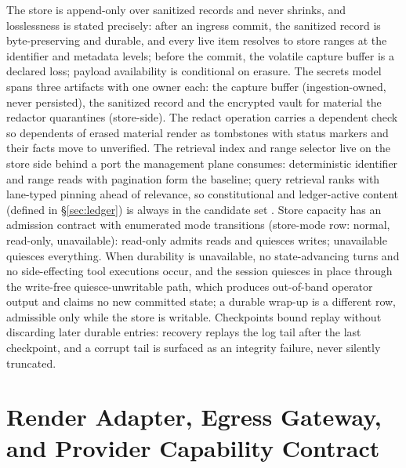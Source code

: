 \documentclass[11pt]{article}
\begin{document}
The store is append-only over sanitized records and never shrinks, and losslessness is stated precisely: after an ingress commit, the sanitized record is byte-preserving and durable, and every live item resolves to store ranges at the identifier and metadata levels; before the commit, the volatile capture buffer is a declared loss; payload availability is conditional on erasure. The secrets model spans three artifacts with one owner each: the capture buffer (ingestion-owned, never persisted), the sanitized record and the encrypted vault for material the redactor quarantines (store-side). The redact operation carries a dependent check so dependents of erased material render as tombstones with status markers and their facts move to unverified. The retrieval index and range selector live on the store side behind a port the management plane consumes: deterministic identifier and range reads with pagination form the baseline; query retrieval ranks with lane-typed pinning ahead of relevance, so constitutional and ledger-active content (defined in \S\ref{sec:ledger}) is always in the candidate set \cite{cliff2026}. Store capacity has an admission contract with enumerated mode transitions (store-mode row: normal, read-only, unavailable): read-only admits reads and quiesces writes; unavailable quiesces everything. When durability is unavailable, no state-advancing turns and no side-effecting tool executions occur, and the session quiesces in place through the write-free quiesce-unwritable path, which produces out-of-band operator output and claims no new committed state; a durable wrap-up is a different row, admissible only while the store is writable. Checkpoints bound replay without discarding later durable entries: recovery replays the log tail after the last checkpoint, and a corrupt tail is surfaced as an integrity failure, never silently truncated.

\section{Render Adapter, Egress Gateway, and Provider Capability Contract}
\label{sec:mat}
\end{document}
